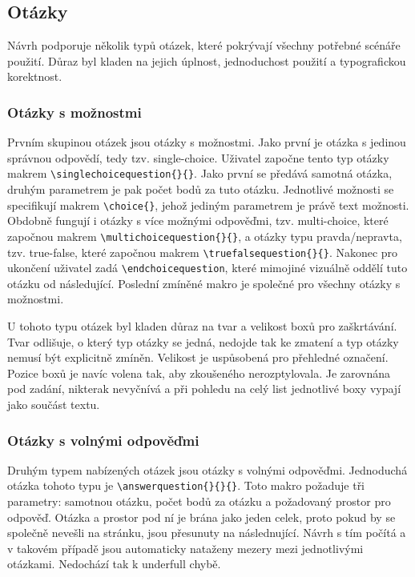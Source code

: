 \documentclass{article}
\begin{document}
\subsection{Otázky}
    Návrh podporuje několik typů otázek, které pokrývají všechny potřebné scénáře použití. Důraz byl kladen
    na jejich úplnost, jednoduchost použití a typografickou korektnost.

\subsubsection*{Otázky s možnostmi}
    Prvním skupinou otázek jsou otázky s možnostmi. Jako první je otázka s jedinou správnou odpovědí,
    tedy tzv. single-choice. Uživatel započne tento typ otázky makrem \texttt{\textbackslash singlechoicequestion\{\}\{\}}.
    Jako první se předává samotná otázka, druhým parametrem je pak počet bodů za tuto otázku.
    Jednotlivé možnosti se specifikují makrem \texttt{\textbackslash choice\{\}}, jehož jediným
    parametrem je právě text možnosti.
    Obdobně fungují i otázky s více možnými odpověďmi, tzv. multi-choice, které započnou makrem \texttt{\textbackslash multichoicequestion\{\}\{\}},
    a otázky typu pravda/nepravta, tzv. true-false, které započnou makrem \texttt{\textbackslash truefalsequestion\{\}\{\}}.
    Nakonec pro ukončení uživatel zadá \texttt{\textbackslash endchoicequestion}, které mimojiné vizuálně oddělí tuto
    otázku od následující. Poslední zmíněné makro je společné pro všechny otázky s možnostmi.

    U tohoto typu otázek byl kladen důraz na tvar a velikost boxů pro zaškrtávání. Tvar odlišuje, o který typ
    otázky se jedná, nedojde tak ke zmatení a typ otázky nemusí být explicitně zmíněn. Velikost je uspůsobená
    pro přehledné označení. Pozice boxů je navíc volena tak, aby zkoušeného nerozptylovala. Je zarovnána pod zadání, nikterak nevyčnívá
    a při pohledu na celý list jednotlivé boxy vypají jako součást textu.

    \subsubsection*{Otázky s volnými odpověďmi}
    Druhým typem nabízených otázek jsou otázky s volnými odpověďmi. Jednoduchá otázka tohoto typu je
    \texttt{\textbackslash answerquestion\{\}\{\}\{\}}. Toto makro požaduje tři parametry: samotnou otázku,
    počet bodů za otázku a požadovaný prostor pro odpověď. Otázka a prostor pod ní je brána jako jeden celek,
    proto pokud by se společně nevešli na stránku, jsou přesunuty na následnující. Návrh s tím počítá a
    v takovém případě jsou automaticky nataženy mezery mezi jednotlivými otázkami. Nedochází tak k underfull chybě.
\end{document}
